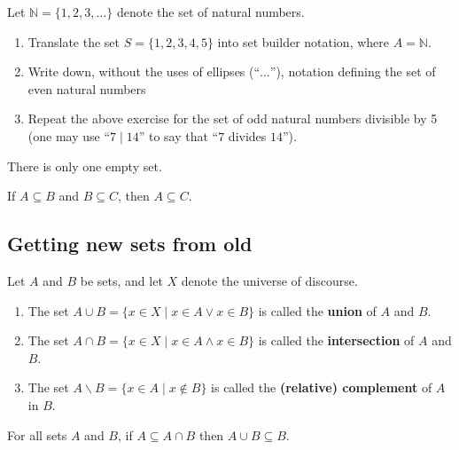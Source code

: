 \begin{exercises} Let $\mathbb{N} = \{1, 2, 3, \ldots\}$ denote the set of natural numbers.\begin{enumerate}
    \item Translate the set $S=\{1, 2, 3, 4, 5\}$ into set builder notation, where $A=\mathbb{N}$.
    \item Write down, without the uses of ellipses (``$\ldots$''), notation defining the set of even natural numbers
    \item Repeat the above exercise for the set of odd natural numbers divisible by 5 (one may use ``$7\mid 14$'' to say that ``$7$ divides $14$'').
\end{enumerate}\end{exercises}

\begin{theorem}\label{thm:nullsetunique} There is only one empty set.
\end{theorem}

\begin{theorem}\label{thm:subsettransitivity}  If $A \subseteq B$ and $B \subseteq C$, then $A \subseteq C$.
\end{theorem}

\subsection{Getting new sets from old}
\begin{definition} \label{def:setunion} Let $A$ and $B$ be sets, and let $X$ denote the universe of discourse.
\begin{enumerate}
    \item  The set $A \cup B = \{x\in X\mid x \in A \lor x\in B\}$ is called the \textbf{union} of $A$ and $B$.
    \item \label{def:setintersection} The set $A \cap B = \{x\in X\mid x \in A \land x\in B\}$ is called the \textbf{intersection} of $A$ and $B$.
    \item \label{def:setcomplement} The set $A \smallsetminus B = \{x\in A\mid x \not\in B\}$ is called the \textbf{(relative) complement} of $A$ in $B$.
\end{enumerate}
\end{definition}

\begin{theorem} For all sets $A$ and $B$, if $A \subseteq A \cap B$ then $A \cup B \subseteq B$.
\end{theorem}

